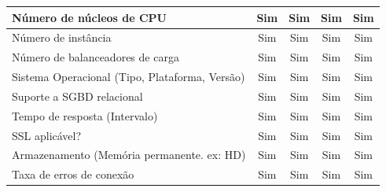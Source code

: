 \documentclass[conference]{IEEEtran}
\begin{document}
\begin{table}[]
\begin{tabular}{|l|c|c|c|c|}
Número de núcleos de CPU                                       & Sim                         & Sim                                                & Sim                                                & Sim                                              \\ \hline
Número de instância                                            & Sim                         & Sim                                                & Sim                                                & Sim                                              \\ \hline
Número de balanceadores de carga                               & Sim                         & Sim                                                & Sim                                                & Sim                                              \\ \hline
Sistema Operacional (Tipo, Plataforma, Versão)                 & Sim                         & Sim                                                & Sim                                                & Sim                                              \\ \hline
Suporte a SGBD relacional                                      & Sim                         & Sim                                                & Sim                                                & Sim                                              \\ \hline
Tempo de resposta (Intervalo)                                  & Sim                         & Sim                                                & Sim                                                & Sim                                              \\ \hline
SSL aplicável?                                                 & Sim                         & Sim                                                & Sim                                                & Sim                                              \\ \hline
Armazenamento (Memória permanente. ex: HD)                     & Sim                         & Sim                                                & Sim                                                & Sim                                              \\ \hline
Taxa de erros de conexão                                       & Sim                         & Sim                                                & Sim                                                & Sim                                              \\ \hline

\end{tabular}
\end{table}
\end{document}
